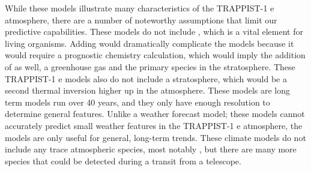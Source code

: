 While these models illustrate many characteristics of the
 TRAPPIST-1 e atmosphere, there are a number of noteworthy assumptions that
 limit our predictive capabilities. These models do not include , which
 is a vital element for living organisms. Adding  would dramatically
 complicate the models because it would require a prognostic chemistry
 calculation, which would imply the addition of  as well, a greenhouse
 gas and the primary species in the stratosphere. These TRAPPIST-1 e models also do
 not include a stratosphere, which would be a second thermal inversion higher
 up in the atmosphere. These models are long term models run over 40 years, and
 they only have enough resolution to determine general features. Unlike a
 weather forecast model; these models cannot accurately predict small weather
 features in the TRAPPIST-1 e atmosphere, the models are only useful for
 general, long-term trends. These climate models do not include any trace
 atmospheric species, most notably , but there are many more species
 that could be detected during a transit from a telescope.

